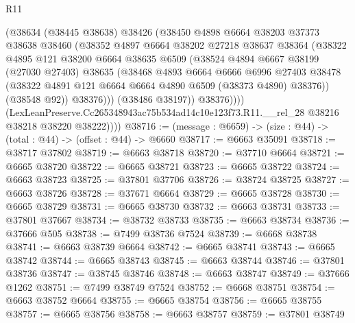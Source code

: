 \begin{lexlean}{R11}
\begin{coremodule}
                  (@38634
                    (@38445 @38638)
                    @38426
                    (@38450
                      @4898
                      @6664
                      @38203
                      @37373
                      @38638
                      @38460
                      (@38352
                        @4897
                        @6664
                        @38202
                        @27218
                        @38637
                        @38364
                        (@38322
                          @4895
                          @121
                          @38200
                          @6664
                          @38635
                          @6509
                          (@38524
                            @4894
                            @6667
                            @38199
                            (@27030 @27403)
                            @38635
                            (@38468
                              @4893
                              @6664
                              @6666
                              @6996
                              @27403
                              @38478
                              (@38322 @4891 @121 @6664 @6664 @4890 @6509 (@38373 @4890) @38376))
                            (@38548 @92))
                          @38376)))
                    (@38486 @38197))
                  @38376))))
          (LexLeanPreserve.Cc265348943ac75b534ad14c10e123f73.R11.__rel_28
            @38216
            @38218
            @38220
            @38222))))
@38716 := (message : @6659) -> (size : @44) -> (total : @44) -> (offset : @44) -> @6660
@38717 := @6663 @35091
@38718 := @38717 @37802
@38719 := @6663 @38718
@38720 := @37710 @6664
@38721 := @6665 @38720
@38722 := @6665 @38721
@38723 := @6665 @38722
@38724 := @6663 @38723
@38725 := @37801 @37706
@38726 := @38724 @38725
@38727 := @6663 @38726
@38728 := @37671 @6664
@38729 := @6665 @38728
@38730 := @6665 @38729
@38731 := @6665 @38730
@38732 := @6663 @38731
@38733 := @37801 @37667
@38734 := @38732 @38733
@38735 := @6663 @38734
@38736 := @37666 @505
@38738 := @7499 @38736 @7524
@38739 := @6668 @38738
@38741 := @6663 @38739 @6664
@38742 := @6665 @38741
@38743 := @6665 @38742
@38744 := @6665 @38743
@38745 := @6663 @38744
@38746 := @37801 @38736
@38747 := @38745 @38746
@38748 := @6663 @38747
@38749 := @37666 @1262
@38751 := @7499 @38749 @7524
@38752 := @6668 @38751
@38754 := @6663 @38752 @6664
@38755 := @6665 @38754
@38756 := @6665 @38755
@38757 := @6665 @38756
@38758 := @6663 @38757
@38759 := @37801 @38749

\end{coremodule}
\end{lexlean}
